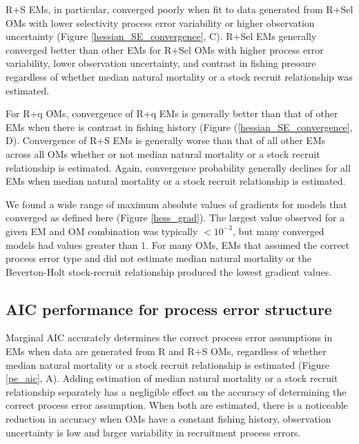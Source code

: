 \documentclass[
  12pt,
]{article}
\begin{document}
R+S EMs, in particular, converged poorly when fit to data generated from
R+Sel OMs with lower selectivity process error variability or higher
observation uncertainty (Figure \ref{hessian_SE_convergence}, C). R+Sel
EMs generally converged better than other EMs for R+Sel OMs with higher
process error variability, lower observation uncertainty, and contrast
in fishing pressure regardless of whether median natural mortality or a
stock recruit relationship was estimated.

For R+q OMs, convergence of R+q EMs is generally better than that of
other EMs when there is contrast in fishing history (Figure
(\ref{hessian_SE_convergence}, D). Convergence of R+S EMs is generally
worse than that of all other EMs across all OMs whether or not median
natural mortality or a stock recruit relationship is estimated. Again,
convergence probability generally declines for all EMs when median
natural mortality or a stock recruit relationship is estimated.

We found a wide range of maximum absolute values of gradients for models
that converged as defined here (Figure \ref{hess_grad}). The largest
value observed for a given EM and OM combination was typically
\(<10^{-3}\), but many converged models had values greater than 1. For
many OMs, EMs that assumed the correct process error type and did not
estimate median natural mortality or the Beverton-Holt stock-recruit
relationship produced the lowest gradient values.

\hypertarget{aic-performance-for-process-error-structure}{%
\subsection*{AIC performance for process error
structure}\label{aic-performance-for-process-error-structure}}

Marginal AIC accurately determines the correct process error assumptions
in EMs when data are generated from R and R+S OMs, regardless of whether
median natural mortality or a stock recruit relationship is estimated
(Figure \ref{pe_aic}, A). Adding estimation of median natural mortality
or a stock recruit relationship separately has a negligible effect on
the accuracy of determining the correct process error assumption. When
both are estimated, there is a noticeable reduction in accuracy when OMs
have a constant fishing history, observation uncertainty is low and
larger variability in recruitment process errors.
\end{document}
